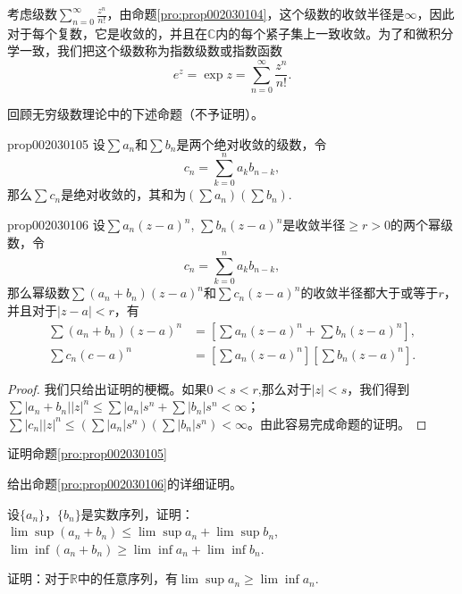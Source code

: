 考虑级数$\sum\limits_{n=0}^{\infty}{\frac{z^n}{n!}}$，由命题\ref{pro:prop002030104}，这个级数的收敛半径是$\infty$，因此对于每个复数，它是收敛的，并且在$\mathbb{C}$内的每个紧子集上一致收敛。为了和微积分学一致，我们把这个级数称为指数级数或指数函数
\[
e^z = \exp{z} = \sum_{n=0}^{\infty}{\frac{z^n}{n!}}.
\]

回顾无穷级数理论中的下述命题（不予证明）。

\begin{proposition}{}{prop002030105}
设$\sum{a_n}$和$\sum{b_n}$是两个绝对收敛的级数，令
\[
c_n = \sum_{k=0}^{n}{a_kb_{n-k}},
\]
那么$\sum{c_n}$是绝对收敛的，其和为$(\sum{a_n})(\sum{b_n})$.
\end{proposition}

\begin{proposition}{}{prop002030106}
设$\sum{a_n(z-a)^n}$, $\sum{b_n(z-a)^n}$是收敛半径$\ge r > 0$的两个幂级数，令
\[
c_n = \sum_{k=0}^{n}{a_kb_{n-k}},
\]
那么幂级数$\sum(a_n + b_n)(z-a)^n$和$\sum{c_n(z-a)^n}$的收敛半径都大于或等于$r$，并且对于$|z-a|<r$，有
\[
\begin{aligned}
\sum{(a_n+b_n)(z-a)^n} &= [\sum{a_n(z-a)^n} + \sum{b_n(z-a)^n}],\\
\sum{c_n(c-a)^n} &= [\sum{a_n(z-a)^n}][\sum{b_n(z-a)^n}].
\end{aligned}
\]
\end{proposition}

\begin{proof}
我们只给出证明的梗概。如果$0 < s < r$,那么对于$|z| < s$，我们得到$\sum{|a_n+b_n||z|^n} \le \sum{|a_n|s^n} + \sum{|b_n|s^n} < \infty$；$\sum{|c_n||z|^n} \le (\sum{|a_n|s^n})(\sum{|b_n|s^n}) < \infty$。由此容易完成命题的证明。
\end{proof}

\begin{exercise}
证明命题\ref{pro:prop002030105}
\end{exercise}

\begin{exercise}
给出命题\ref{pro:prop002030106}的详细证明。
\end{exercise}

\begin{exercise}
设$\{a_n\}$，$\{b_n\}$是实数序列，证明：$\lim\sup{(a_n + b_n)} \le \lim\sup{a_n} + \lim\sup{b_n}$, $\lim\inf{(a_n+b_n)} \ge \lim\inf{a_n} + \lim\inf{b_n}$.
\end{exercise}

\begin{exercise}
证明：对于$\mathbb{R}$中的任意序列，有$\lim\sup{a_n} \ge \lim\inf{a_n}$.
\end{exercise}

